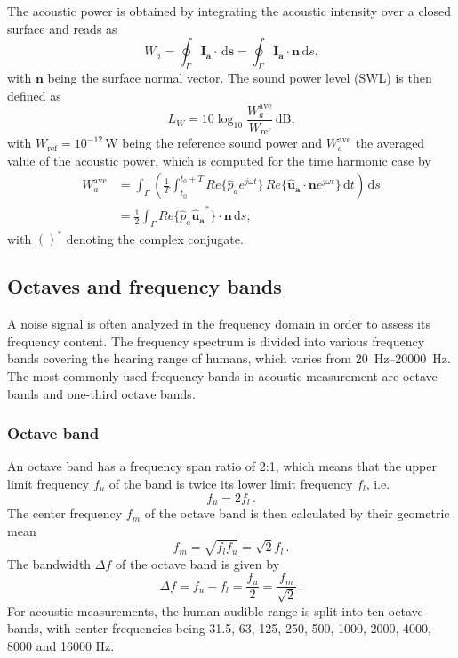 The acoustic power is obtained by integrating the acoustic intensity over a closed surface and reads as
\begin{equation}
	W_a = \oint_{\Gamma} \boldsymbol{I_a}\cdot\,\text{d}\boldsymbol{s} = \oint_{\Gamma} \boldsymbol{I_a}\cdot\boldsymbol{n}\,\text{d}s \text{,}
\end{equation}
with $\boldsymbol{n}$ being the surface normal vector. The sound power level (SWL) is then defined as
\begin{equation}
	L_W = 10\log_{10}\frac{W_a^{\text{ave}}}{W_\text{ref}}\,\text{dB}\text{,}
\end{equation}
with $W_\text{ref} = 10^{-12}\,\text{W}$ being the reference sound power and $W_a^{\text{ave}}$ the averaged value of the acoustic power, which is computed for the time harmonic case by
\begin{align}
	W_a^{\text{ave}} &= \int_{\Gamma}\left(\frac{1}{T} \int_{t_0}^{t_0 + T} Re\lbrace\hat{p}_a e^{j\omega t}\rbrace\,Re\lbrace\boldsymbol{\hat{u}_a} \cdot \boldsymbol{n} e^{j\omega t}\rbrace \, \text{d}t  \right)\,\text{d}s \\
	&= \frac{1}{2} \int_{\Gamma} Re\lbrace\hat{p}_a \boldsymbol{\hat{u}_a}^*\rbrace \cdot \boldsymbol{n}\,\text{d}s \text{,}
\end{align}
with $()^*$ denoting the complex conjugate.

\newpage
\subsection{Octaves and frequency bands}

A noise signal is often analyzed in the frequency domain in order to assess its frequency content. The frequency spectrum is divided into various frequency bands covering the hearing range of humans, which varies from \SIrange{20}{20000}{\hertz}. The most commonly used frequency bands in acoustic measurement are octave bands and one-third octave bands.

\subsubsection*{Octave band}
An octave band has a frequency span ratio of 2:1, which means that the upper limit frequency $f_u$ of the band is twice its lower limit frequency $f_l$, i.e.
\begin{equation}
	f_u = 2f_l\,.
\end{equation}
The center frequency $f_m$ of the octave band is then calculated by their geometric mean
\begin{equation}
	f_m = \sqrt{f_l f_u} = \sqrt{2}f_l\,.
\end{equation}
The bandwidth $\Delta f$ of the octave band is given by
\begin{equation}
	\Delta f = f_u - f_l = \frac{f_u}{2} = \frac{f_m}{\sqrt{2}}\,.
\end{equation}
For acoustic measurements, the human audible range is split into ten octave bands, with center frequencies being 31.5, 63, 125, 250, 500, 1000, 2000, 4000, 8000 and 16000 Hz.

